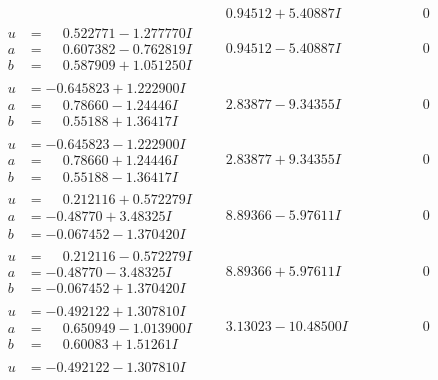 \documentclass[1p]{elsarticle_modified}
\theoremstyle{definition}
\begin{document}
$$\begin{array}{c|c|c}
 & \phantom{-}0.94512 + 5.40887 I & \phantom{-0.000000 } 0 \\ \hline\begin{aligned}
u &= \phantom{-}0.522771 - 1.277770 I \\
a &= \phantom{-}0.607382 - 0.762819 I \\
b &= \phantom{-}0.587909 + 1.051250 I\end{aligned}
 & \phantom{-}0.94512 - 5.40887 I & \phantom{-0.000000 } 0 \\ \hline\begin{aligned}
u &= -0.645823 + 1.222900 I \\
a &= \phantom{-}0.78660 - 1.24446 I \\
b &= \phantom{-}0.55188 + 1.36417 I\end{aligned}
 & \phantom{-}2.83877 - 9.34355 I & \phantom{-0.000000 } 0 \\ \hline\begin{aligned}
u &= -0.645823 - 1.222900 I \\
a &= \phantom{-}0.78660 + 1.24446 I \\
b &= \phantom{-}0.55188 - 1.36417 I\end{aligned}
 & \phantom{-}2.83877 + 9.34355 I & \phantom{-0.000000 } 0 \\ \hline\begin{aligned}
u &= \phantom{-}0.212116 + 0.572279 I \\
a &= -0.48770 + 3.48325 I \\
b &= -0.067452 - 1.370420 I\end{aligned}
 & \phantom{-}8.89366 - 5.97611 I & \phantom{-0.000000 } 0 \\ \hline\begin{aligned}
u &= \phantom{-}0.212116 - 0.572279 I \\
a &= -0.48770 - 3.48325 I \\
b &= -0.067452 + 1.370420 I\end{aligned}
 & \phantom{-}8.89366 + 5.97611 I & \phantom{-0.000000 } 0 \\ \hline\begin{aligned}
u &= -0.492122 + 1.307810 I \\
a &= \phantom{-}0.650949 - 1.013900 I \\
b &= \phantom{-}0.60083 + 1.51261 I\end{aligned}
 & \phantom{-}3.13023 - 10.48500 I & \phantom{-0.000000 } 0 \\ \hline\begin{aligned}
u &= -0.492122 - 1.307810 I \\

\end{aligned}
\end{array}$$
\end{document}
